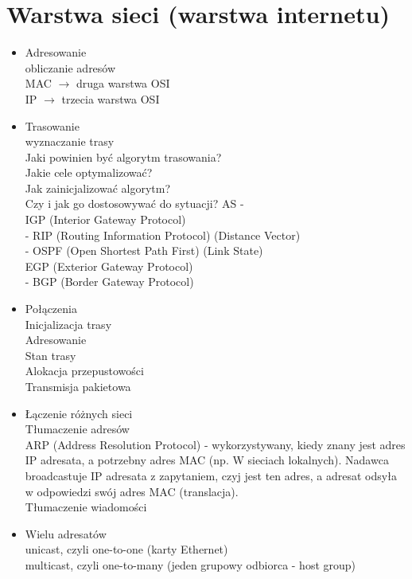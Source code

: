 \documentclass[]{article}
\begin{document}
\label{sec:warstwa-sieci}
\section{Warstwa sieci (warstwa internetu)}
\begin{itemize}
    \item Adresowanie \\
    obliczanie adresów \\
    MAC $\rightarrow$ druga warstwa OSI \\
    IP $\rightarrow$ trzecia warstwa OSI
    \item Trasowanie \\
    wyznaczanie trasy \\
    Jaki powinien być algorytm trasowania? \\
    Jakie cele optymalizować? \\
    Jak zainicjalizować algorytm? \\
    Czy i jak go dostosowywać do sytuacji?
    AS - \\
    IGP (Interior Gateway Protocol) \\
    - RIP (Routing Information Protocol) (Distance Vector) \\
    - OSPF (Open Shortest Path First) (Link State) \\
    EGP (Exterior Gateway Protocol) \\
    - BGP (Border Gateway Protocol)
    \item Połączenia \\
    Inicjalizacja trasy \\
    Adresowanie \\
    Stan trasy \\
    Alokacja przepustowości \\
    Transmisja pakietowa
    \item Łączenie różnych sieci \\
    Tłumaczenie adresów \\
    ARP (Address  Resolution Protocol) - wykorzystywany, kiedy znany jest adres IP adresata, a potrzebny adres MAC (np. W sieciach lokalnych). Nadawca broadcastuje IP adresata z zapytaniem, czyj jest ten adres, a adresat odsyła w odpowiedzi swój adres MAC (translacja). \\
    Tłumaczenie wiadomości
    \item Wielu adresatów \\
    unicast, czyli one-to-one (karty Ethernet) \\
    multicast, czyli one-to-many (jeden grupowy odbiorca - host group) \\

\end{itemize}
\end{document}
